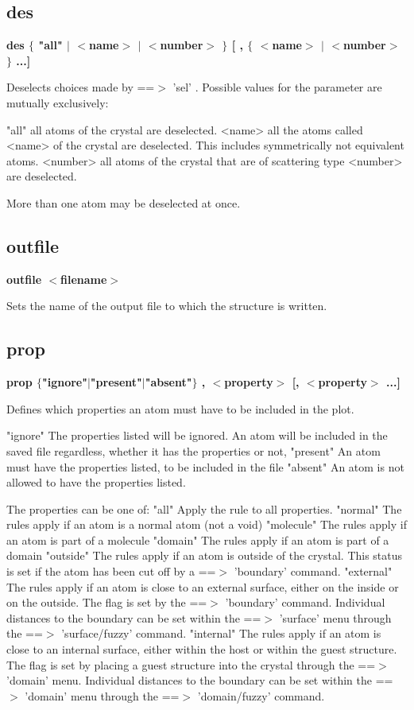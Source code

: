 \subsection*{des}
{\bf des $ \{$ "all" $| $ $ <$name$> $ $| $ $ <$number$> $ $\} $ [ , $ \{$ $ <$name$> $ $| $ $ <$number$> $ $\} $ ...] \par }
\par
\vspace{3pt}
Deselects choices made by ==$> $ 'sel' . Possible values 
for the parameter are mutually exclusively: 
\par
\begin{MacVerbatim}
"all"     all atoms of the crystal are deselected.
<name>    all the atoms called <name> of the crystal are deselected.
          This includes symmetrically not equivalent atoms.
<number>  all atoms of the crystal that are of scattering type <number>
          are deselected.
\end{MacVerbatim}
More than one atom may be deselected at once. 
\subsection*{outfile}
{\bf outfile $ <$filename$> $ \par }
\par
\vspace{3pt}
Sets the name of the output file to which the structure is written. 
\subsection*{prop}
{\bf prop $ \{$"ignore"$| $"present"$| $"absent"$\} $ , $ <$property$> $ [, $ <$property$> $ ...] \par }
\par
\vspace{3pt}
Defines which properties an atom must have to be included in the plot. 
\par
"ignore" 
The properties listed will be ignored. An atom will be included in 
the saved file regardless, whether it has the properties or not, 
"present" 
An atom must have the properties listed, to be included in the file 
"absent" 
An atom is not allowed to have the properties listed. 
\par
The properties can be one of: 
"all" 
Apply the rule to all properties. 
"normal" 
The rules apply if an atom is a normal atom (not a void) 
"molecule" 
The rules apply if an atom is part of a molecule 
"domain" 
The rules apply if an atom is part of a domain 
"outside" 
The rules apply if an atom is outside of the crystal. This status 
is set if the atom has been cut off by a ==$> $ 'boundary' command. 
"external" 
The rules apply if an atom is close to an external surface, either 
on the inside or on the outside. 
The flag is set by the ==$> $ 'boundary' command. Individual distances 
to the boundary can be set within the ==$> $ 'surface' menu through 
the ==$> $ 'surface/fuzzy' command. 
"internal" 
The rules apply if an atom is close to an internal surface, either 
within the host or within the guest structure. 
The flag is set by placing a guest structure into the crystal through 
the ==$> $ 'domain' menu. Individual distances 
to the boundary can be set within the ==$> $ 'domain' menu through 
the ==$> $ 'domain/fuzzy' command. 
